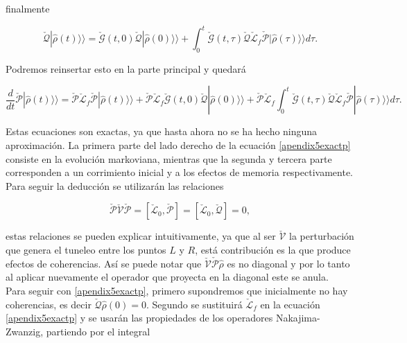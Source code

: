 \begin{appendixs}
finalmente

\begin{equation*}
    \check{\mathcal{Q}}|\hat{\rho}(t)\rangle \rangle = \check{\mathcal{G}}(t,0)\check{\mathcal{Q}}|\hat{\rho}(0)\rangle \rangle  + \int_{0}^{t}\check{\mathcal{G}}(t,\tau)\check{\mathcal{Q}}\check{\mathcal{L}}_{f} \check{\mathcal{P}}|\hat{\rho}(\tau)\rangle \rangle d\tau.    
\end{equation*}

Podremos reinsertar esto en la parte principal y quedará

\begin{equation}
    \frac{d}{dt}\check{\mathcal{P}}|\hat{\rho}(t)\rangle \rangle  = \check{\mathcal{P}}\check{\mathcal{L}}_{f}\check{\mathcal{P}}|\hat{\rho}(t)\rangle \rangle  + \check{\mathcal{P}}\check{\mathcal{L}}_{f}\check{\mathcal{G}}(t,0)\check{\mathcal{Q}}|\hat{\rho}(0)\rangle \rangle  + \check{\mathcal{P}}\check{\mathcal{L}}_{f}\int_{0}^{t}\check{\mathcal{G}}(t,\tau)\check{\mathcal{Q}}\check{\mathcal{L}}_{f} \check{\mathcal{P}}|\hat{\rho}(\tau)\rangle \rangle d\tau.    
    \label{apendix5exactp}
\end{equation}

Estas ecuaciones son exactas, ya que hasta ahora no se ha hecho ninguna aproximación. La primera parte del lado derecho de la ecuación \ref{apendix5exactp} consiste en la evolución markoviana, mientras que la segunda y  tercera parte corresponden a un corrimiento inicial y a los efectos de memoria respectivamente. Para seguir la deducción se utilizarán las relaciones

\begin{equation*}
    \check{\mathcal{P}}\check{\mathcal{V}}\check{\mathcal{P}} = [\check{\mathcal{L}}_0,\check{\mathcal{P}}] = [\check{\mathcal{L}}_0,\check{\mathcal{Q}}] = 0, 
\end{equation*}

estas relaciones se pueden explicar intuitivamente, ya que al ser $\check{\mathcal{V}}$ la perturbación que genera el tuneleo entre los puntos $L$ y $R$, está contribución es la que produce efectos de coherencias. Así se puede notar que $\check{\mathcal{V}}\check{\mathcal{P}}\hat{\rho}$ es no diagonal y por lo tanto al aplicar nuevamente el operador que proyecta en la diagonal este se anula.
\\
Para seguir con \ref{apendix5exactp}, primero supondremos que inicialmente no hay coherencias, es decir $\check{\mathcal{Q}}\hat{\rho}(0) = 0$. Segundo se sustituirá $\check{\mathcal{L}}_{f}$ en la ecuación \ref{apendix5exactp} y se usarán las propiedades de los operadores Nakajima-Zwanzig, partiendo por el integral


\end{appendixs}
